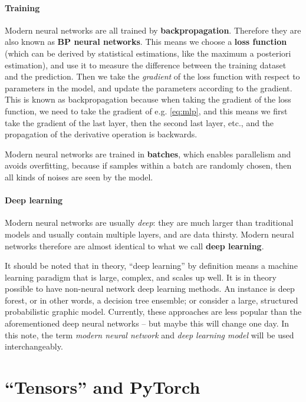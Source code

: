 \documentclass[hyperref, a4paper, 12pt]{report}
\newcommand*{\concept}[1]{{\textbf{#1}}}
\begin{document}
\paragraph*{Training}

Modern neural networks are all trained by \concept{backpropagation}.
Therefore they are also known as \concept{BP neural networks}.
This means we choose a \concept{loss function} (which can be derived by statistical estimations,
like the maximum a posteriori estimation),
and use it to measure the difference between the training dataset and the prediction.
Then we take the \emph{gradient} of the loss function with respect to parameters in the model,
and update the parameters according to the gradient.
This is known as backpropagation because when taking the gradient of the loss function,
we need to take the gradient of e.g. \eqref{eq:mlp},
and this means we first take the gradient of the last layer,
then the second last layer, etc.,
and the propagation of the derivative operation is backwards.

Modern neural networks are trained in \concept{batches},
which enables parallelism and avoids overfitting,
because if samples within a batch are randomly chosen,
then all kinds of noises are seen by the model.

\paragraph*{Deep learning}
Modern neural networks are usually \emph{deep}:
they are much larger than traditional models and usually contain multiple layers,
and are data thirsty.
Modern neural networks therefore are almost identical to what we call \concept{deep learning}.

It should be noted that in theory, ``deep learning'' by definition means a machine learning paradigm that is large, complex, and scales up well.
It is in theory possible to have non-neural network deep learning methods.
An instance is deep forest, or in other words, a decision tree ensemble;
or consider a large, structured probabilistic graphic model.
Currently, these approaches are less popular than the aforementioned deep neural networks
-- but maybe this will change one day.
In this note, the term \emph{modern neural network} and \emph{deep learning model} will be used interchangeably.

\section{``Tensors'' and PyTorch}\label{sec:tensor}
\end{document}
